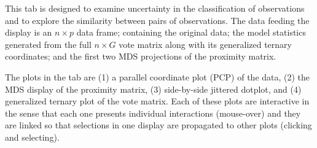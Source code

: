 \documentclass[smallextended,natbib]{svjour3}\usepackage[]{graphicx}\usepackage[]{xcolor}
\begin{document}
This tab is designed to examine uncertainty in the classification of observations and to explore the similarity between pairs of observations. The data feeding the display is an $n\times p$ data frame; containing the original data; the model statistics generated from the full $n\times G$ vote matrix along with its generalized ternary coordinates; and the first two MDS projections of the proximity matrix. 

The plots in the tab are (1) a parallel coordinate plot (PCP) of the data, (2) the MDS display of the proximity matrix, (3) side-by-side jittered dotplot, and (4) generalized ternary plot of the vote matrix. Each of these plots are interactive in the sense that each one presents individual interactions (mouse-over) and they are linked so that selections in one display are propagated to other plots (clicking and selecting).
\end{document}
